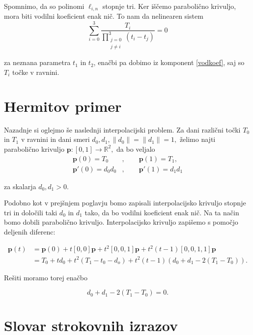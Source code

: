 \documentclass[mat1]{fmfdelo}
\newcommand{\R}{\mathbb R}
\begin{document}
Spomnimo, da so polinomi $\ell_{i,n}$ stopnje tri. Ker iščemo parabolično krivuljo, mora biti vodilni koeficient enak nič. To nam da nelinearen sistem
\begin{equation}\label{vodkoef}
\sum_{i = 0}^{3} \frac{T_i}{\prod_{\substack{j = 0 \\ j \neq i}}^3(t_i - t_j)} = 0
\end{equation}

za neznana parametra $t_1$ in $t_2$, enačbi pa dobimo iz komponent \eqref{vodkoef}, saj so $T_i$ točke v ravnini.




\section{Hermitov primer}

Nazadnje si oglejmo še naslednji interpolacijski problem. Za dani različni točki $T_0$ in $T_1$ v ravnini in dani smeri $d_0, d_1, \lVert d_0 \rVert = \lVert d_1 \rVert = 1,$ želimo najti parabolično krivuljo $\textbf{p} : [ 0, 1 ] \rightarrow \R^2,$ da bo veljalo
\begin{align*}
\textbf{p}(0) = T_0&, \qquad \textbf{p}(1) = T_1, \\
\textbf{p}'(0) = d_0 d_0&, \qquad \textbf{p}'(1) = d_1 d_1 
\end{align*}

za skalarja $d_0, d_1 > 0$.

Podobno kot v prejšnjem poglavju bomo zapisali interpolacijsko krivuljo stopnje tri in določili taki $d_0$ in $d_1$ tako, da bo vodilni koeficient enak nič. Na ta način bomo dobili parabolično krivuljo. Interpolacijsko krivuljo zapišemo s pomočjo deljenih diferenc:

\begin{align*}
\textbf{p}(t) &= \textbf{p}(0) + t [0,0]\textbf{p} + t^2[0,0,1]\textbf{p} + t^2(t - 1)[0,0,1,1]\textbf{p} \\
	&= T_0 + t d_0 + t^2(T_1 - t_0 - d_o) + t^2(t - 1)(d_0 + d_1 - 2(T_1 - T_0))
.\end{align*}

Rešiti moramo torej enačbo

\begin{equation}
d_0 + d_1 - 2(T_1 - T_0) = 0
.\end{equation}


\section*{Slovar strokovnih izrazov}

\geslo{}{}
\geslo{}{}


\begin{thebibliography}{99}


\end{thebibliography}
\end{document}
